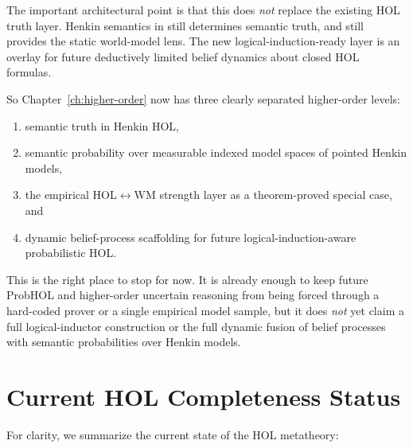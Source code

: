 \documentclass[11pt,openany]{report}
\begin{document}
The important architectural point is that this does \emph{not} replace the
existing HOL truth layer.  Henkin semantics in
 still determines semantic
truth, and  still provides the
static world-model lens.  The new logical-induction-ready layer is an overlay
for future deductively limited belief dynamics about closed HOL formulas.

So Chapter~\ref{ch:higher-order} now has three clearly separated higher-order
levels:
\begin{enumerate}
\item semantic truth in Henkin HOL,
\item semantic probability over measurable indexed model spaces of pointed
  Henkin models,
\item the empirical HOL$\leftrightarrow$WM strength layer as a theorem-proved
  special case, and
\item dynamic belief-process scaffolding for future logical-induction-aware
  probabilistic HOL.
\end{enumerate}

This is the right place to stop for now.  It is already enough to keep future
ProbHOL and higher-order uncertain reasoning from being forced through a
hard-coded prover or a single empirical model sample, but it does \emph{not}
yet claim a full logical-inductor construction or the full dynamic fusion of
belief processes with semantic probabilities over Henkin models.

\section{Current HOL Completeness Status}
\label{sec:hol-completeness-status}

For clarity, we summarize the current state of the HOL metatheory:
\end{document}
